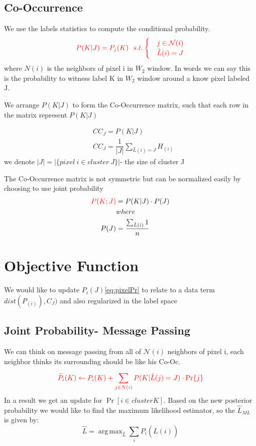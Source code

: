 \documentclass{article}
\DeclareMathOperator*{\argmax}{arg\,max}
\begin{document}
\subsection{Co-Occurrence}
We use the labels statistics to compute the conditional probability.
$$ \color{red}
 P(K|J)=P _j(K) \ \ s.t. \begin{cases}
&j \in {\mathcal{N}(i)}\\
&\hat{L}(i)=J
\end{cases}  $$
where $ N(i) $ is the neighbors of pixel i in $ W_2 $ window.
In words we can say this is the probability to witness label K in $ W_2 $ window around a know pixel labeled J.

We arrange $ P(K|J) $ to form the Co-Occurrence matrix, such that each row in the matrix represent $ P(K|J) $

\begin{align}
&CC_J= P(K|J)\label{eq:CoOc}\\
&CC_J=\dfrac{1}{|J|} \sum_{\hat{L}(i)=J}H_{(i)}\nonumber
\end{align}
we denote $ |J|=|\{pixel\ i\in cluster\ J\}| $- the size of cluster J

The Co-Occurrence matrix is not symmetric but can be normalized easily by choosing to use joint probability 
\begin{align}
\color{red}
P(K;J)&=P(K|J)\cdot P(J) \label{eq:jointprob}\\
&where\nonumber\\
P(J)&=\dfrac{\sum_{\hat{L}(i)}^{}   1}{n} \nonumber
\end{align}

\section{Objective Function}
We would like to update  $ P_{i}(J) $\eqref{eq:pixelPr} to relate to a data term $ dist(P_{(i)} ),C_J) $ and also regularized in the label space

\subsection{Joint Probability- Message Passing}
We can think on message passing from all of $\mathcal{N}(i)$ neighbors of pixel i, each neighbor thinks its surrounding should be like his Co-Oc.
\begin{equation}
\color{red}
\widetilde{P}_i(K) \leftarrow P_i(K) + \sum_{j\in N(i)}^{} P(K|\hat{L}(j)=J)\cdot \Pr\{j\}
\end{equation}
In a result we get an update for $ \Pr [i \in cluster K] $. Based on the new posterior probability we would like to find the maximum likelihood estimator, so the $ \hat{L}_{ML} $ is given by:
$$ \hat{L}=\argmax _{\hat{L}} \sum_{i}^{}P_i(\hat{L}(i)) $$
\end{document}
